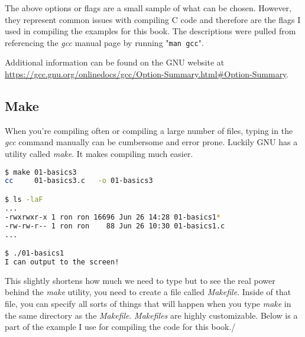 \documentclass[../main.tex]{subfiles}
\begin{document}
The above options or flags are a small sample of what can be chosen.  However, they represent common issues with compiling C code and therefore are the flags I used in compiling the examples for this book.  The descriptions were pulled from referencing the \textit{gcc} manual page by running "\texttt{man gcc}".

Additional information can be found on the GNU website at \href{https://gcc.gnu.org/onlinedocs/gcc/Option-Summary.html\#Option-Summary}{https://gcc.gnu.org/onlinedocs/gcc/Option-Summary.html\#Option-Summary}.


\subsection{Make}

When you're compiling often or compiling a large number of files, typing in the \textit{gcc} command manually can be cumbersome and error prone.  Luckily GNU has a utility called \textit{make}.  It makes compiling much easier.\\

\begin{lstlisting}[language=bash, numbers=none]
$ make 01-basics3
cc     01-basics3.c   -o 01-basics3

$ ls -laF
...
-rwxrwxr-x 1 ron ron 16696 Jun 26 14:28 01-basics1*
-rw-rw-r-- 1 ron ron    88 Jun 26 10:30 01-basics1.c
...

$ ./01-basics1 
I can output to the screen!
\end{lstlisting}

This slightly shortens how much we need to type but to see the real power behind the \textit{make} utility, you need to create a file called \textit{Makefile}.  Inside of that file, you can specify all sorts of things that will happen when you type \textit{make} in the same directory as the \textit{Makefile}.  \textit{Makefiles} are highly customizable.  Below is a part of the example I use for compiling the code for this book./\\


\end{document}
